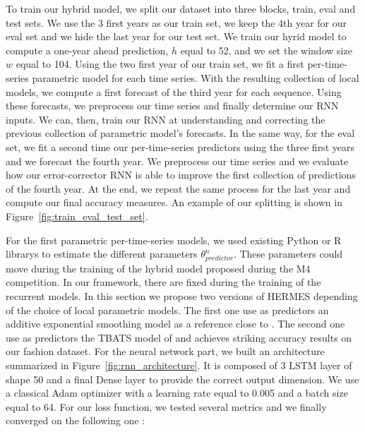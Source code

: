 \documentclass{article} %
\newcommand{\statparam}{\theta_{predictor}}
\newcommand{\lag}{h}
\newcommand{\window}{w}
\begin{document}
To train our hybrid model, we split our dataset into three blocks, train, eval and test sets. We use the 3 first years as our train set, we keep the 4th year for our eval set and we hide the last year for our test set. We train our hyrid model to compute a one-year ahead prediction, $\lag$ equal to 52, and we set the window size $\window$ equal to 104.
Using the two first year of our train set, we fit a first per-time-series parametric model for each time series. With the resulting collection of local models, we compute a first forecast of the third year for each sequence. Using these forecasts, we preprocess our time series and finally determine our RNN inputs. We can, then, train our RNN at understanding and correcting the previous collection of parametric model's forecasts. In the same way, for the eval set, we fit a second time our per-time-series predictors using the three first years and we forecast the fourth year. We preprocess our time series and we evaluate how our error-corrector RNN is able to improve the first collection of predictions of the fourth year.
At the end, we repeat the same process for the last year and compute our final accuracy measures. An example of our splitting is shown in  Figure~\ref{fig:train_eval_test_set}.


For the first parametric per-time-series models, we used existing Python or R librarys to estimate the different parameters $\statparam^n$. These parameters could move during the training of the hybrid model proposed during the M4 competition. In our framework, there are fixed during the training of the recurrent models. In this section we propose two versions of HERMES depending of the choice of local parametric models. The first one use as predictors an additive exponential smoothing model as a reference close to \cite{smyl2020hybrid}. The second one use as predictors the TBATS model of \cite{doi:10.1198/jasa.2011.tm09771} and  achieves striking accuracy results on our fashion dataset. For the neural network part, we built an architecture summarized in Figure~\ref{fig:rnn_architecture}. It is composed of 3 LSTM layer of shape 50 and a final Dense layer to provide the correct output dimension. We use a classical Adam optimizer with a learning rate equal to 0.005 and a batch size equal to 64. For our loss function, we tested several metrics and we finally converged on the following one :
\end{document}
